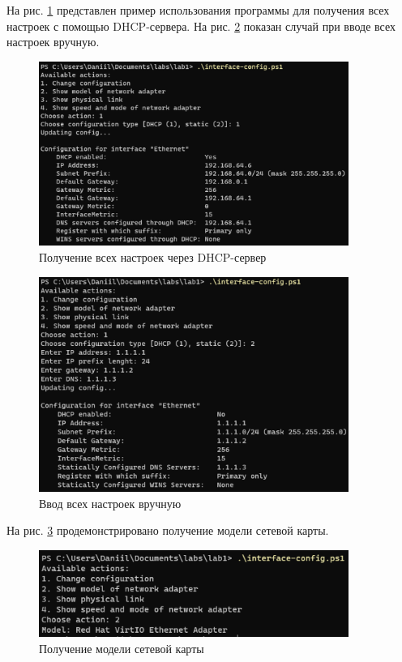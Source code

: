 \documentclass[a4paper, 14pt]{extarticle}
\begin{document}
На рис. \ref{fig:ps1-dhcp} представлен пример использования программы для
получения всех настроек с помощью DHCP-сервера. На рис. \ref{fig:ps1-static}
показан случай при вводе всех настроек вручную.

\begin{figure}[H]
  \centering
  \includegraphics[width=0.9\textwidth]{images/ps1/dhcp.png}
  \caption{Получение всех настроек через DHCP-сервер}
  \label{fig:ps1-dhcp}
\end{figure}

\begin{figure}[H]
  \centering
  \includegraphics[width=0.9\textwidth]{images/ps1/static.png}
  \caption{Ввод всех настроек вручную}
  \label{fig:ps1-static}
\end{figure}

На рис. \ref{fig:ps1-model} продемонстрировано получение модели сетевой карты.

\begin{figure}[H]
  \centering
  \includegraphics[width=0.9\textwidth]{images/ps1/model.png}
  \caption{Получение модели сетевой карты}
  \label{fig:ps1-model}
\end{figure}
\end{document}
